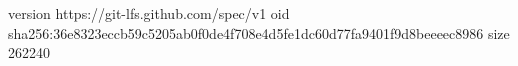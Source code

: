 version https://git-lfs.github.com/spec/v1
oid sha256:36e8323eccb59c5205ab0f0de4f708e4d5fe1dc60d77fa9401f9d8beeeec8986
size 262240
